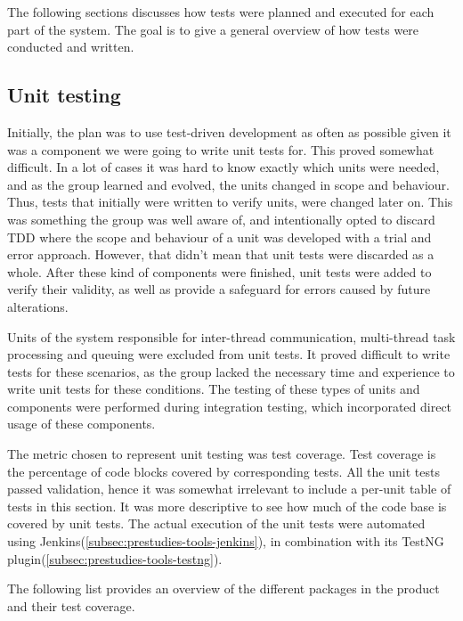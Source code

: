 The following sections discusses how tests were planned and executed for each part of the system. The goal is to give a general overview of how tests were conducted and written.

\subsection{Unit testing}
\label{subsec:testing-test_execution-unit_testing}

Initially, the plan was to use test-driven development as often as possible given it was a component we were going to write unit tests for. This proved somewhat difficult. In a lot of cases it was hard to know exactly which units were needed, and as the group learned and evolved, the units changed in scope and behaviour. Thus, tests that initially were written to verify units, were changed later on. This was something the group was well aware of, and intentionally opted to discard TDD where the scope and behaviour of a unit was developed with a trial and error approach. However, that didn't mean that unit tests were discarded as a whole. After these kind of components were finished, unit tests were added to verify their validity, as well as provide a safeguard for errors caused by future alterations.

Units of the system responsible for inter-thread communication, multi-thread task processing and queuing were excluded from unit tests. It proved difficult to write tests for these scenarios, as the group lacked the necessary time and experience to write unit tests for these conditions. The testing of these types of units and components were performed during integration testing, which incorporated direct usage of these components.

The metric chosen to represent unit testing was test coverage. Test coverage is the percentage of code blocks covered by corresponding tests. All the unit tests passed validation, hence it was somewhat irrelevant to include a per-unit table of tests in this section. It was more descriptive to see how much of the code base is covered by unit tests. The actual execution of the unit tests were automated using Jenkins(\ref{subsec:prestudies-tools-jenkins}), in combination with its TestNG plugin(\ref{subsec:prestudies-tools-testng}).

The following list provides an overview of the different packages in the product and their test coverage.

